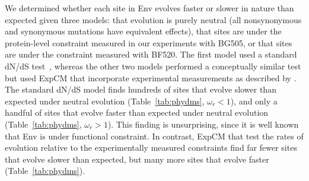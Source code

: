 \documentclass[9pt]{elife}
\begin{document}
\begin{figure}
\end{figure}

We determined whether each site in Env evolves faster or slower in nature than expected given three models: that evolution is purely neutral (all nonsynonymous and synonymous mutations have equivalent effects), that sites are under the protein-level constraint measured in our experiments with BG505, or that sites are under the constraint measured with BF520. 
The first model used a standard dN/dS test~\citep[the ``FEL'' method of][]{kosakovsky2005not}, whereas the other two models performed a conceptually similar test but used ExpCM that incorporate experimental measurements as described by \citet{bloom2017identification}.
The standard dN/dS model finds hundreds of sites that evolve slower than expected under neutral evolution (Table~\ref{tab:phydms}, $\omega_r < 1$), and only a handful of sites that evolve faster than expected under neutral evolution (Table~\ref{tab:phydms}, $\omega_r > 1$).
This finding is unsurprising, since it is well known that Env is under functional constraint.
In contrast, ExpCM that test the rates of evolution relative to the experimentally measured constraints find far fewer sites that evolve slower than expected, but many more sites that evolve faster (Table~\ref{tab:phydms}). 
\end{document}
